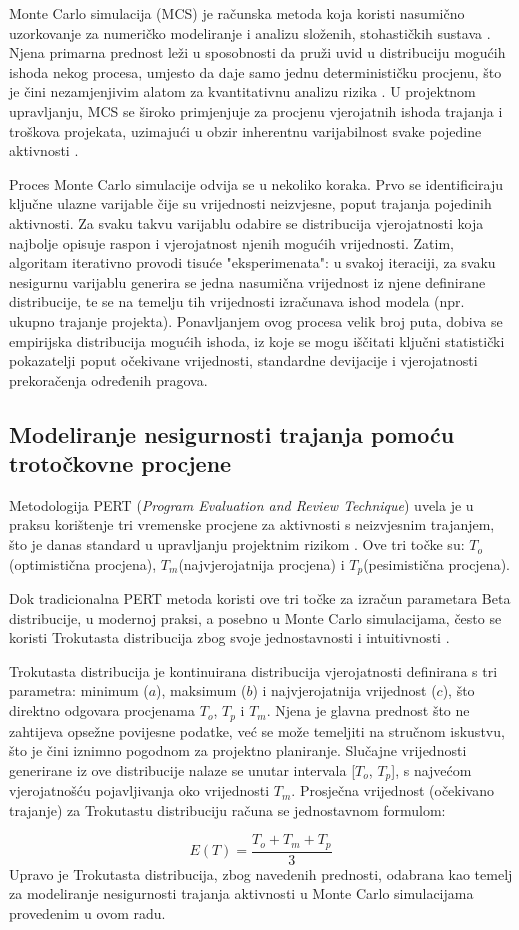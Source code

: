 Monte Carlo simulacija (MCS) je računska metoda koja koristi nasumično uzorkovanje za numeričko modeliranje i analizu složenih, stohastičkih sustava \cite{Rubinstein2016}. Njena primarna prednost leži u sposobnosti da pruži uvid u distribuciju mogućih ishoda nekog procesa, umjesto da daje samo jednu determinističku procjenu, što je čini nezamjenjivim alatom za kvantitativnu analizu rizika \cite{Vose2008}. U projektnom upravljanju, MCS se široko primjenjuje za procjenu vjerojatnih ishoda trajanja i troškova projekata, uzimajući u obzir inherentnu varijabilnost svake pojedine aktivnosti \cite{Miller2009, Avlijas2008}.

Proces Monte Carlo simulacije odvija se u nekoliko koraka. Prvo se identificiraju ključne ulazne varijable čije su vrijednosti neizvjesne, poput trajanja pojedinih aktivnosti. Za svaku takvu varijablu odabire se distribucija vjerojatnosti koja najbolje opisuje raspon i vjerojatnost njenih mogućih vrijednosti. Zatim, algoritam iterativno provodi tisuće "eksperimenata": u svakoj iteraciji, za svaku nesigurnu varijablu generira se jedna nasumična vrijednost iz njene definirane distribucije, te se na temelju tih vrijednosti izračunava ishod modela (npr. ukupno trajanje projekta). Ponavljanjem ovog procesa velik broj puta, dobiva se empirijska distribucija mogućih ishoda, iz koje se mogu iščitati ključni statistički pokazatelji poput očekivane vrijednosti, standardne devijacije i vjerojatnosti prekoračenja određenih pragova.

\subsection{Modeliranje nesigurnosti trajanja pomoću trotočkovne procjene}

Metodologija PERT (\textit{Program Evaluation and Review Technique}) uvela je u praksu korištenje tri vremenske procjene za aktivnosti s neizvjesnim trajanjem, što je danas standard u upravljanju projektnim rizikom \cite{Malcolm1959}. Ove tri točke su: $T_o$(optimistična procjena), $T_m$(najvjerojatnija procjena) i $T_p$(pesimistična procjena).

Dok tradicionalna PERT metoda koristi ove tri točke za izračun parametara Beta distribucije, u modernoj praksi, a posebno u Monte Carlo simulacijama, često se koristi Trokutasta distribucija zbog svoje jednostavnosti i intuitivnosti \cite{Law2015}. 

Trokutasta distribucija je kontinuirana distribucija vjerojatnosti definirana s tri parametra: minimum ($a$), maksimum ($b$) i najvjerojatnija vrijednost ($c$), što direktno odgovara procjenama $T_o$, $T_p$ i $T_m$. Njena je glavna prednost što ne zahtijeva opsežne povijesne podatke, već se može temeljiti na stručnom iskustvu, što je čini iznimno pogodnom za projektno planiranje. Slučajne vrijednosti generirane iz ove distribucije nalaze se unutar intervala [$T_o$, $T_p$], s najvećom vjerojatnošću pojavljivanja oko vrijednosti $T_m$. Prosječna vrijednost (očekivano trajanje) za Trokutastu distribuciju računa se jednostavnom formulom:

$$
E(T) = \frac{T_o + T_m + T_p}{3}
$$
Upravo je Trokutasta distribucija, zbog navedenih prednosti, odabrana kao temelj za modeliranje nesigurnosti trajanja aktivnosti u Monte Carlo simulacijama provedenim u ovom radu.
